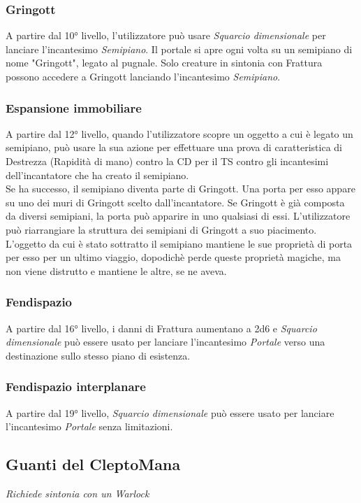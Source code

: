 \subsubsection{Gringott}
A partire dal 10° livello, l'utilizzatore può usare \textit{Squarcio dimensionale} per lanciare l'incantesimo \textit{Semipiano}. Il portale si apre ogni volta su un semipiano di nome "Gringott", legato al pugnale. Solo creature in sintonia con Frattura possono accedere a Gringott lanciando l'incantesimo \textit{Semipiano}.

\subsubsection{Espansione immobiliare}
A partire dal 12° livello, quando l'utilizzatore scopre un oggetto a cui è legato un semipiano, può usare la sua azione per effettuare una prova di caratteristica di Destrezza (Rapidità di mano) contro la CD per il TS contro gli incantesimi dell'incantatore che ha creato il semipiano.\\
Se ha successo, il semipiano diventa parte di Gringott. Una porta per esso appare su uno dei muri di Gringott scelto dall'incantatore. Se Gringott è già composta da diversi semipiani, la porta può apparire in uno qualsiasi di essi. L'utilizzatore può riarrangiare la struttura dei semipiani di Gringott a suo piacimento.\\
L'oggetto da cui è stato sottratto il semipiano mantiene le sue proprietà di porta per esso per un ultimo viaggio, dopodichè perde queste proprietà magiche, ma non viene distrutto e mantiene le altre, se ne aveva.

\subsubsection{Fendispazio}
A partire dal 16° livello, i danni di Frattura aumentano a 2d6 e \textit{Squarcio dimensionale} può essere usato per lanciare l'incantesimo \textit{Portale} verso una destinazione sullo stesso piano di esistenza.

\subsubsection{Fendispazio interplanare}
A partire dal 19° livello, \textit{Squarcio dimensionale} può essere usato per lanciare l'incantesimo \textit{Portale} senza limitazioni.

\subsection{Guanti del CleptoMana}
\textit{Richiede sintonia con un Warlock} 

